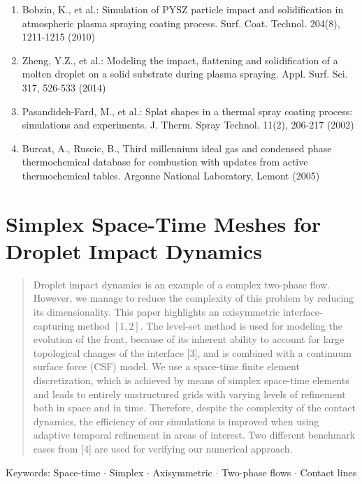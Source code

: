 \documentclass[10pt]{article}
\begin{document}
\begin{enumerate}
  \item Bobzin, K., et al.: Simulation of PYSZ particle impact and solidification in atmospheric plasma spraying coating process. Surf. Coat. Technol. 204(8), 1211-1215 (2010)

  \item Zheng, Y.Z., et al.: Modeling the impact, flattening and solidification of a molten droplet on a solid substrate during plasma spraying. Appl. Surf. Sci. 317, 526-533 (2014)

  \item Pasandideh-Fard, M., et al.: Splat shapes in a thermal spray coating process: simulations and experiments. J. Therm. Spray Technol. 11(2), 206-217 (2002)

  \item Burcat, A., Ruscic, B., Third millennium ideal gas and condensed phase thermochemical database for combustion with updates from active thermochemical tables. Argonne National Laboratory, Lemont (2005)

\end{enumerate}

\section*{Simplex Space-Time Meshes for Droplet Impact Dynamics }


\begin{abstract}
Droplet impact dynamics is an example of a complex two-phase flow. However, we manage to reduce the complexity of this problem by reducing its dimensionality. This paper highlights an axisymmetric interface-capturing method $[1,2]$. The level-set method is used for modeling the evolution of the front, because of its inherent ability to account for large topological changes of the interface [3], and is combined with a continuum surface force (CSF) model. We use a space-time finite element discretization, which is achieved by means of simplex space-time elements and leads to entirely unstructured grids with varying levels of refinement both in space and in time. Therefore, despite the complexity of the contact dynamics, the efficiency of our simulations is improved when using adaptive temporal refinement in areas of interest. Two different benchmark cases from [4] are used for verifying our numerical approach.
\end{abstract}

Keywords: Space-time $\cdot$ Simplex $\cdot$ Axisymmetric $\cdot$ Two-phase flows $\cdot$ Contact lines
\end{document}
